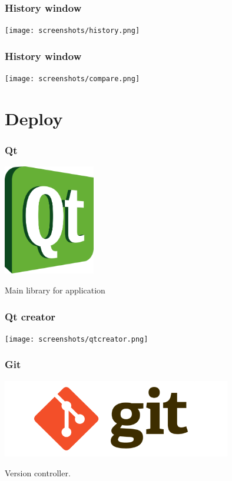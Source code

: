 \documentclass{beamer}
\begin{document}
\begin{frame}
  \frametitle{History window}
\begin{center}
	\texttt{[image: screenshots/history.png]}
\end{center}
\end{frame}

\begin{frame}
  \frametitle{History window}
\begin{center}
	\texttt{[image: screenshots/compare.png]}
\end{center}
\end{frame}

\section{Deploy}
\begin{frame}
  \frametitle{Qt}
\begin{center}
	\includegraphics[width=4cm]{img/qt.png}
	\begin{block}{}
		Main library for application
	\end{block}
\end{center}
\end{frame}

\begin{frame}
  \frametitle{Qt creator}
\begin{center}
	\texttt{[image: screenshots/qtcreator.png]}
\end{center}
\end{frame}
\begin{frame}
  \frametitle{Git}
\begin{center}
	\includegraphics[width=10cm]{img/git.png}
	\begin{block}{}
		Version controller.
	\end{block}
\end{center}
\end{frame}
\end{document}
